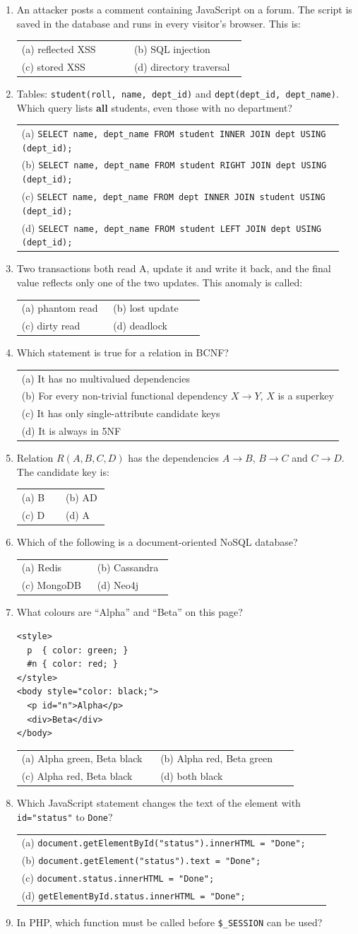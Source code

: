 \documentclass[11pt,a4paper]{article}
\makeatletter
\newcommand{\opts}[4]{\par\nopagebreak\vspace{2pt}%
\begin{tabular}{@{}p{0.47\linewidth}p{0.47\linewidth}@{}}
(a) #1 & (b) #2\\ (c) #3 & (d) #4\end{tabular}}
\newcommand{\optl}[4]{\par\nopagebreak\vspace{2pt}%
\begin{tabular}{@{}p{0.95\linewidth}@{}}
(a) #1\\ (b) #2\\ (c) #3\\ (d) #4\end{tabular}}
\makeatother
\begin{document}
\begin{enumerate}[resume]
\opts{SYN flood}{Xmas scan}{ACK scan}{Null scan}
\item An attacker posts a comment containing JavaScript on a forum. The script is saved in the database and runs in every visitor's browser. This is:
\opts{reflected XSS}{SQL injection}{stored XSS}{directory traversal}
\item Tables: \texttt{student(roll, name, dept\_id)} and \texttt{dept(dept\_id, dept\_name)}. Which query lists \textbf{all} students, even those with no department?
\optl{\texttt{SELECT name, dept\_name FROM student INNER JOIN dept USING (dept\_id);}}{\texttt{SELECT name, dept\_name FROM student RIGHT JOIN dept USING (dept\_id);}}{\texttt{SELECT name, dept\_name FROM dept INNER JOIN student USING (dept\_id);}}{\texttt{SELECT name, dept\_name FROM student LEFT JOIN dept USING (dept\_id);}}
\item Two transactions both read A, update it and write it back, and the final value reflects only one of the two updates. This anomaly is called:
\opts{phantom read}{lost update}{dirty read}{deadlock}
\item Which statement is true for a relation in BCNF?
\optl{It has no multivalued dependencies}{For every non-trivial functional dependency $X \to Y$, $X$ is a superkey}{It has only single-attribute candidate keys}{It is always in 5NF}
\item Relation $R(A,B,C,D)$ has the dependencies $A \to B$, $B \to C$ and $C \to D$. The candidate key is:
\opts{B}{AD}{D}{A}
\item Which of the following is a document-oriented NoSQL database?
\opts{Redis}{Cassandra}{MongoDB}{Neo4j}
\item What colours are ``Alpha'' and ``Beta'' on this page?
\begin{verbatim}
<style>
  p  { color: green; }
  #n { color: red; }
</style>
<body style="color: black;">
  <p id="n">Alpha</p>
  <div>Beta</div>
</body>
\end{verbatim}
\opts{Alpha green, Beta black}{Alpha red, Beta green}{Alpha red, Beta black}{both black}
\item Which JavaScript statement changes the text of the element with \texttt{id="status"} to \texttt{Done}?
\optl{\texttt{document.getElementById("status").innerHTML = "Done";}}{\texttt{document.getElement("status").text = "Done";}}{\texttt{document.status.innerHTML = "Done";}}{\texttt{getElementById.status.innerHTML = "Done";}}
\item In PHP, which function must be called before \texttt{\$\_SESSION} can be used?

\end{enumerate}
\end{document}
